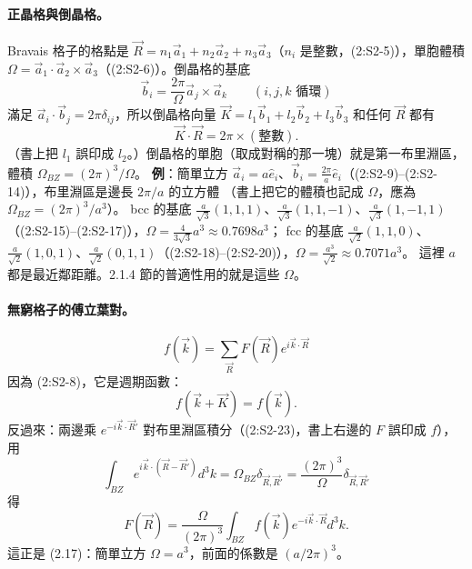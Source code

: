 \paragraph{正晶格與倒晶格。}
Bravais 格子的格點是 $\vec R=n_1\vec a_1+n_2\vec a_2+n_3\vec a_3$（$n_i$ 是整數，(2:S2-5)），單胞體積 $\Omega=\vec a_1\cdot\vec a_2\times\vec a_3$（(2:S2-6)）。倒晶格的基底
\[\vec b_i=\frac{2\pi}\Omega\vec a_j\times\vec a_k\qquad(i,j,k\text{ 循環})\tag{2:S2-7}\]
滿足 $\vec a_i\cdot\vec b_j=2\pi\delta_{ij}$，所以倒晶格向量 $\vec K=l_1\vec b_1+l_2\vec b_2+l_3\vec b_3$ 和任何 $\vec R$ 都有
\[\vec K\cdot\vec R=2\pi\times(\text{整數}).\tag{2:S2-8}\]
（書上把 $l_1$ 誤印成 $l_2$。）倒晶格的單胞（取成對稱的那一塊）就是第一布里淵區，體積 $\Omega_{BZ}=(2\pi)^3/\Omega$。
\textbf{例}：簡單立方 $\vec a_i=a\hat e_i$、$\vec b_i=\frac{2\pi}a\hat e_i$（(2:S2-9)--(2:S2-14)），布里淵區是邊長 $2\pi/a$ 的立方體
（書上把它的體積也記成 $\Omega$，應為 $\Omega_{BZ}=(2\pi)^3/a^3$）。
bcc 的基底 $\frac a{\sqrt3}(1,1,1)$、$\frac a{\sqrt3}(1,1,-1)$、$\frac a{\sqrt3}(1,-1,1)$（(2:S2-15)--(2:S2-17)），$\Omega=\frac4{3\sqrt3}a^3\approx0.7698a^3$；
fcc 的基底 $\frac a{\sqrt2}(1,1,0)$、$\frac a{\sqrt2}(1,0,1)$、$\frac a{\sqrt2}(0,1,1)$（(2:S2-18)--(2:S2-20)），$\Omega=\frac{a^3}{\sqrt2}\approx0.7071a^3$。
這裡 $a$ 都是最近鄰距離。2.1.4 節的普適性用的就是這些 $\Omega$。

\paragraph{無窮格子的傅立葉對。}
\[f(\vec k)=\sum_{\vec R}F(\vec R)e^{i\vec k\cdot\vec R}\tag{2:S2-21}\]
因為 (2:S2-8)，它是週期函數：
\[f(\vec k+\vec K)=f(\vec k).\tag{2:S2-22}\]
反過來：兩邊乘 $e^{-i\vec k\cdot\vec R'}$ 對布里淵區積分（(2:S2-23)，書上右邊的 $F$ 誤印成 $f$），用
\[\int_{BZ}e^{i\vec k\cdot(\vec R-\vec R')}d^3k=\Omega_{BZ}\delta_{\vec R,\vec R'}=\frac{(2\pi)^3}\Omega\delta_{\vec R,\vec R'}\tag{2:S2-24}\]
得
\[F(\vec R)=\frac\Omega{(2\pi)^3}\int_{BZ}f(\vec k)e^{-i\vec k\cdot\vec R}d^3k.\tag{2:S2-25}\]
這正是 (2.17)：簡單立方 $\Omega=a^3$，前面的係數是 $(a/2\pi)^3$。

